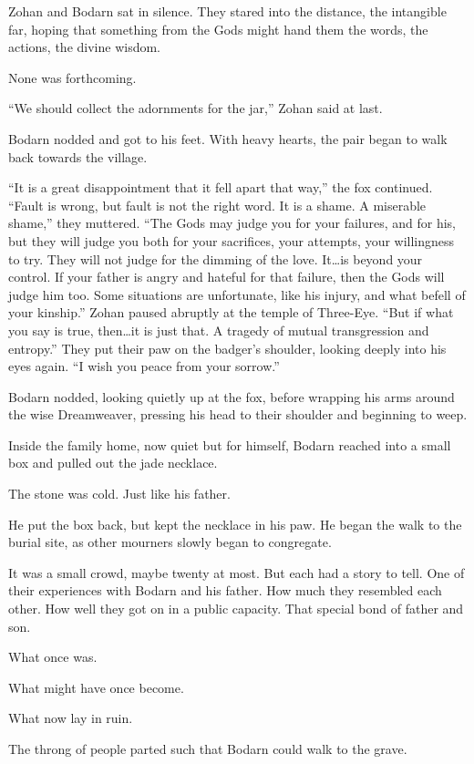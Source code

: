 Zohan and Bodarn sat in silence. They stared into the distance, the intangible far, hoping that something from the Gods might hand them the words, the actions, the divine wisdom.

None was forthcoming.

``We should collect the adornments for the jar,'' Zohan said at last.

Bodarn nodded and got to his feet. With heavy hearts, the pair began to walk back towards the village.

``It is a great disappointment that it fell apart that way,'' the fox continued. ``Fault is wrong, but fault is not the right word. It is a shame. A miserable shame,'' they muttered. ``The Gods may judge you for your failures, and for his, but they will judge you both for your sacrifices, your attempts, your willingness to try. They will not judge for the dimming of the love. It\ldots{}is beyond your control. If your father is angry and hateful for that failure, then the Gods will judge him too. Some situations are unfortunate, like his injury, and what befell of your kinship.'' Zohan paused abruptly at the temple of Three-Eye. ``But if what you say is true, then\ldots{}it is just that. A tragedy of mutual transgression and entropy.'' They put their paw on the badger's shoulder, looking deeply into his eyes again. ``I wish you peace from your sorrow.''

Bodarn nodded, looking quietly up at the fox, before wrapping his arms around the wise Dreamweaver, pressing his head to their shoulder and beginning to weep.

\secdiv

\noindent Inside the family home, now quiet but for himself, Bodarn reached into a small box and pulled out the jade necklace.

The stone was cold. Just like his father.

He put the box back, but kept the necklace in his paw. He began the walk to the burial site, as other mourners slowly began to congregate.

It was a small crowd, maybe twenty at most. But each had a story to tell. One of their experiences with Bodarn and his father. How much they resembled each other. How well they got on in a public capacity. That special bond of father and son.

What once was.

What might have once become.

What now lay in ruin.

The throng of people parted such that Bodarn could walk to the grave.


